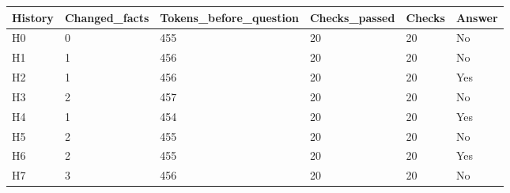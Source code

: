 \begin{tabular}{llllll}
History & Changed\_facts & Tokens\_before\_question & Checks\_passed & Checks & Answer \\
\hline
H0 & 0 & 455 & 20 & 20 & No \\
H1 & 1 & 456 & 20 & 20 & No \\
H2 & 1 & 456 & 20 & 20 & Yes \\
H3 & 2 & 457 & 20 & 20 & No \\
H4 & 1 & 454 & 20 & 20 & Yes \\
H5 & 2 & 455 & 20 & 20 & No \\
H6 & 2 & 455 & 20 & 20 & Yes \\
H7 & 3 & 456 & 20 & 20 & No \\
\end{tabular}
